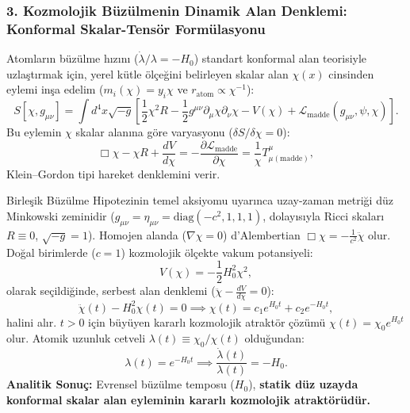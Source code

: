 \subsubsection{3. Kozmolojik Büzülmenin Dinamik Alan Denklemi: Konformal Skalar-Tensör Formülasyonu}
\label{sec:konformal_skalar_tensor}
Atomların büzülme hızını ($\dot{\lambda}/\lambda = -H_0$) standart konformal alan teorisiyle uzlaştırmak için, yerel kütle ölçeğini belirleyen skalar alan $\chi(x)$ cinsinden eylemi inşa edelim ($m_i(\chi) = y_i \chi$ ve $r_{\mathrm{atom}} \propto \chi^{-1}$):
\begin{equation}
    S[\chi, g_{\mu\nu}] = \int d^4x \sqrt{-g} \left[ \frac{1}{2} \chi^2 R - \frac{1}{2} g^{\mu\nu} \partial_\mu \chi \partial_\nu \chi - V(\chi) + \mathcal{L}_{\mathrm{madde}}(g_{\mu\nu}, \psi, \chi) \right].
    \label{eq:wetterich_skalar_eylem}
\end{equation}
Bu eylemin $\chi$ skalar alanına göre varyasyonu ($\delta S / \delta \chi = 0$):
\begin{equation}
    \Box \chi - \chi R + \frac{dV}{d\chi} = -\frac{\partial \mathcal{L}_{\mathrm{madde}}}{\partial \chi} = \frac{1}{\chi} T^\mu_{\mu(\mathrm{madde})},
    \label{eq:chi_alan_denklemi}
\end{equation}
Klein--Gordon tipi hareket denklemini verir.

Birleşik Büzülme Hipotezinin temel aksiyomu uyarınca uzay-zaman metriği düz Minkowski zeminidir ($g_{\mu\nu} = \eta_{\mu\nu} = \text{diag}(-c^2, 1, 1, 1)$, dolayısıyla Ricci skaları $R \equiv 0$, $\sqrt{-g}=1$). Homojen alanda ($\nabla \chi = 0$) d'Alembertian $\Box \chi = -\frac{1}{c^2}\ddot{\chi}$ olur. Doğal birimlerde ($c=1$) kozmolojik ölçekte vakum potansiyeli:
\begin{equation}
    V(\chi) = -\frac{1}{2} H_0^2 \chi^2,
    \label{eq:vakum_baryon_potansiyel}
\end{equation}
olarak seçildiğinde, serbest alan denklemi ($\ddot{\chi} - \frac{dV}{d\chi} = 0$):
\begin{equation}
    \ddot{\chi}(t) - H_0^2 \chi(t) = 0 \implies \chi(t) = c_1 e^{H_0 t} + c_2 e^{-H_0 t},
    \label{eq:chi_ustel_cozum}
\end{equation}
halini alır. $t > 0$ için büyüyen kararlı kozmolojik atraktör çözümü $\chi(t) = \chi_0 e^{H_0 t}$ olur. Atomik uzunluk cetveli $\lambda(t) \equiv \chi_0 / \chi(t)$ olduğundan:
\begin{equation}
    \lambda(t) = e^{-H_0 t} \implies \frac{\dot{\lambda}(t)}{\lambda(t)} = -H_0.
    \label{eq:hubble_baryon_turetilis}
\end{equation}
\textbf{Analitik Sonuç:} Evrensel büzülme temposu ($H_0$), \textbf{statik düz uzayda konformal skalar alan eyleminin kararlı kozmolojik atraktörüdür.}

